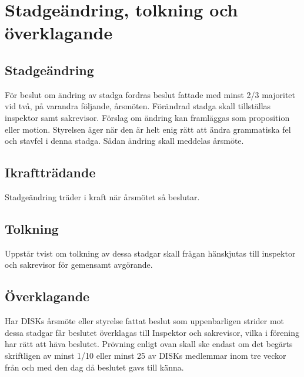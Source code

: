 \clearpage


\section{Stadgeändring, tolkning och överklagande}
\label{sec:stadgeandringtolkningochoverklagande}

	\subsection{Stadgeändring}
	\label{subsec:stadgeandring}
		För beslut om ändring av stadga fordras beslut fattade med minst 2/3 majoritet vid två, på varandra följande, årsmöten. Förändrad stadga skall tillställas inspektor samt sakrevisor. Förslag om ändring kan framläggas som proposition eller motion. Styrelsen äger när den är helt enig rätt att ändra grammatiska fel och stavfel i denna stadga. Sådan ändring skall meddelas årsmöte.

	\subsection{Ikraftträdande}
	\label{subsec:ikrafttradande}
		Stadgeändring träder i kraft när årsmötet så beslutar.

	\subsection{Tolkning}
	\label{subsec:tolkning}
		Uppstår tvist om tolkning av dessa stadgar skall frågan hänskjutas till inspektor och sakrevisor för gemensamt avgörande.

	\subsection{Överklagande}
	\label{subsec:overklagande}
		Har DISKs årsmöte eller styrelse fattat beslut som uppenbarligen strider mot dessa stadgar får beslutet överklagas till Inspektor och sakrevisor, vilka i förening har rätt att häva beslutet. Prövning enligt ovan skall ske endast om det begärts skriftligen av minst 1/10 eller minst 25 av DISKs medlemmar inom tre veckor från och med den dag då beslutet gavs till känna.


